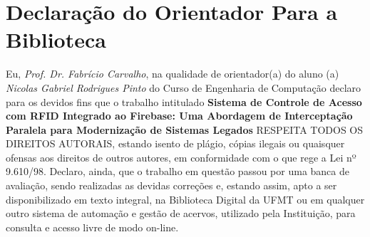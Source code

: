 
\label{Cap:apendice}

\section{Declaração do Orientador Para a Biblioteca}

Eu,  \textit{Prof. Dr. Fabrício Carvalho},  na  qualidade  de orientador(a) do aluno (a) \textit{Nicolas Gabriel Rodrigues Pinto} do Curso de Engenharia de Computação  declaro  para  os  devidos  fins  que  o  trabalho  intitulado \textbf{Sistema de Controle de Acesso com RFID Integrado ao Firebase: Uma Abordagem de Interceptação Paralela para Modernização de Sistemas Legados} RESPEITA TODOS  OS  DIREITOS  AUTORAIS,  estando  isento  de  plágio,  cópias  ilegais  ou quaisquer ofensas aos direitos de outros autores, em conformidade com o que rege a Lei nº 9.610/98. Declaro, ainda, que o trabalho em questão passou por uma banca de  avaliação,  sendo  realizadas  as  devidas  correções  e,  estando  assim,  apto  a  ser disponibilizado em texto integral, na Biblioteca Digital da UFMT ou em qualquer outro sistema de automação e gestão de acervos, utilizado pela Instituição, para consulta e acesso livre de modo on-line.
